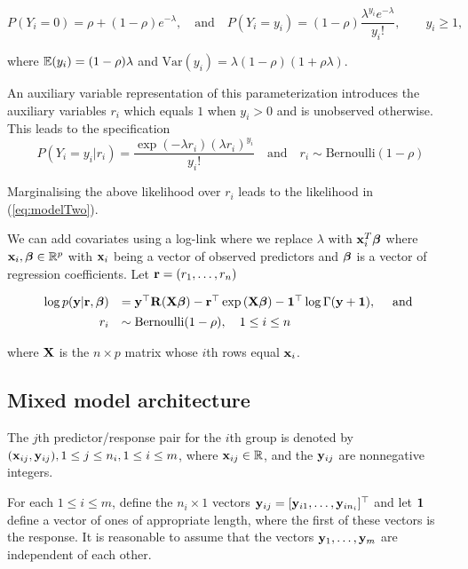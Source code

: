 \documentclass{amsart}[12pt]
\begin{document}
\begin{equation}\label{eq:modelTwo}
	P(Y_i = 0) = \rho + (1 - \rho) e^{-\lambda}, 
	\quad \mbox{and} \quad 
	P(Y_i = y_i) = (1 - \rho) \frac{\lambda^{y_i} e^{-\lambda}} {y_i!},\qquad y_i \ge 1,
\end{equation}

\noindent where ${\mathbb E}(y_i) = (1 - \rho)\lambda$ 
and $\mbox{Var}(y_i) =  \lambda(1 - \rho)(1 + \rho\lambda)$.

\noindent An auxiliary variable representation of this parameterization introduces the auxiliary
variables $r_i$ which equals $1$ when $y_i>0$ and is unobserved otherwise. This leads to the
specification 
$$
P(Y_i=y_i|r_i) = \frac{\exp(-\lambda r_i)(\lambda r_i)^{y_i}}{y_i!} \quad \mbox{and} \quad r_i \sim \mbox{Bernoulli}(1-\rho)
$$

\noindent Marginalising the above likelihood over $r_i$ leads to the likelihood in (\ref{eq:modelTwo}).

\noindent We can add covariates using a log-link where we replace $\lambda$ with ${\bf x}_i^T{\boldsymbol \beta}$ where
${\bf x}_i,{\boldsymbol \beta}\in{\mathbb R}^p$ with ${\bf x}_i$ being a vector of observed predictors and ${\boldsymbol \beta}$ is 
a vector of regression coefficients. Let ${\bf r} = (r_1,\ldots,r_n)$
 
\begin{equation}%
	\begin{array}{rl}
		\log p(\vy|\vr, \vbeta) 
		    & = \vy^\top \mR (\mX\vbeta)                           
		- \vr^\top \exp{(\mX\vbeta)} 
		- \vone^\top \log{\Gamma{(\vy + \vone)}}, \quad \mbox{ and }\\ [1ex]
		r_i & \sim \text{Bernoulli}(1-\rho), \quad 1 \leq i \leq n \\
	\end{array}
\end{equation} 

\noindent where ${\bf X}$ is the $n\times p$ matrix whose $i$th rows equal ${\bf x}_i$.


\subsection{Mixed model architecture}

The $j$th predictor/response pair for the $i$th group is denoted by $({\bf x}_{ij}, {\bf y}_{ij}), 1 \leq j \leq n_i, 1 \leq i \leq m$, where ${\bf x}_{ij} \in {\mathbb{R}}$, and the ${\bf y}_{ij}$ are nonnegative integers.

\noindent For each $1 \leq i \leq m$, define the $n_i \times 1$ vectors ${\bf y}_{ij} = [{\bf y}_{i 1}, \ldots, {\bf y}_{i
	n_i}]^\top$ and let ${\bf 1}$ define a vector of ones of appropriate length, where the first of these vectors is
the response. It is reasonable to assume that the vectors ${\bf y}_1, \ldots, {\bf y}_m$ are independent of each
other.
\end{document}
